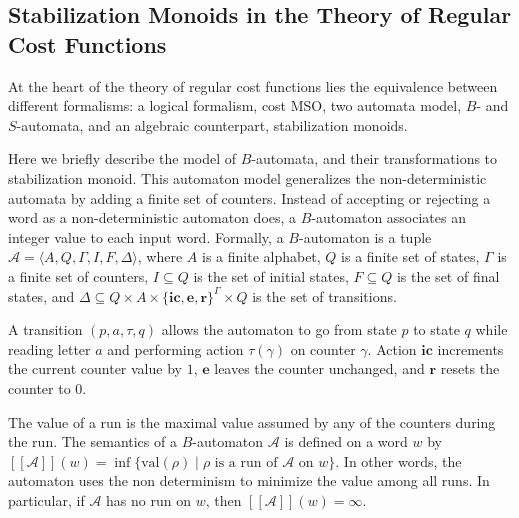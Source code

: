 \documentclass[11pt]{llncs}
\newcommand{\set}[1]{\{ #1 \}}
\newcommand{\A}{\mathcal{A}}
\newcommand{\perm}[1]{\langle #1 \rangle}
\newcommand{\ic}{\mathbf{ic}}
\newcommand{\e}{\mathbf{e}}
\newcommand{\re}{\mathbf{r}}
\newcommand{\val}[1]{\mathrm{val}(#1)}
\newcommand{\sem}[1]{[\![#1]\!]}
\begin{document}
\subsection{Stabilization Monoids in the Theory of Regular Cost Functions}

At the heart of the theory of regular cost functions lies the equivalence between different formalisms:
a logical formalism, cost MSO, two automata model, $B$- and $S$-automata, and an algebraic counterpart, stabilization monoids.

Here we briefly describe the model of $B$-automata, and their transformations to stabilization monoid.
This automaton model generalizes the non-deterministic automata by adding a finite set of counters.
Instead of accepting or rejecting a word as a non-deterministic automaton does, 
a $B$-automaton associates an integer value to each input word.
Formally, a $B$-automaton is a tuple $\A = \perm{A,Q,\Gamma,I,F,\Delta}$, where $A$ is a finite alphabet, $Q$ is a finite set of states, 
$\Gamma$ is a finite set of counters, $I \subseteq Q$ is the set of initial states, $F \subseteq Q$ is the set of final states, 
and $\Delta \subseteq Q \times A \times \set{\ic,\e,\re}^\Gamma \times Q$ is the set of transitions.

A transition $(p,a,\tau,q)$ allows the automaton to go from state $p$ to state $q$ while reading letter $a$ and performing action $\tau(\gamma)$ on counter $\gamma$. 
Action $\ic$ increments the current counter value by $1$, $\e$ leaves the counter unchanged, and $\re$ resets the counter to $0$.

The value of a run is the maximal value assumed by any of the counters during the run.
The semantics of a $B$-automaton $\A$ is defined on a word $w$ by 
$\sem{\A}(w) = \inf\set{\val{\rho} \mid \rho\text{ is a run of } \A \text{ on } w}$.
In other words, the automaton uses the non determinism to minimize the value among all runs.
In particular, if $\A$ has no run on $w$, then $\sem{\A}(w) = \infty$.

\end{document}
